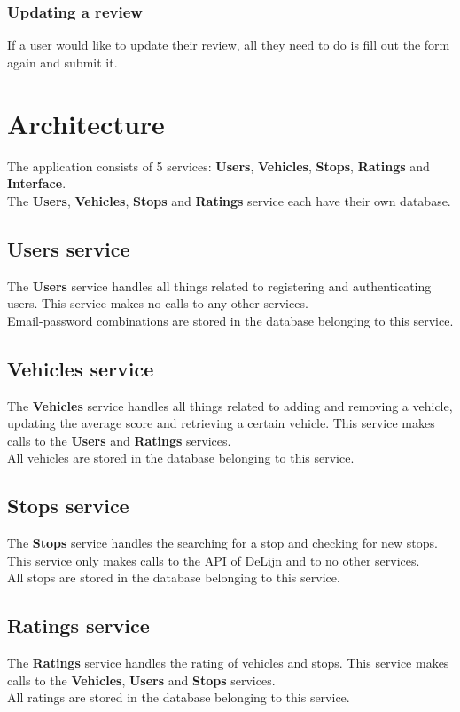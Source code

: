 \documentclass[12pt]{article}
\begin{document}
\subsubsection{Updating a review}
If a user would like to update their review, all they need to do is fill out the form again and submit it.
\newpage

\section{Architecture}
The application consists of 5 services: \textbf{Users}, \textbf{Vehicles}, \textbf{Stops}, \textbf{Ratings} and \textbf{Interface}.\\
The \textbf{Users}, \textbf{Vehicles}, \textbf{Stops} and \textbf{Ratings} service each have their own database. 

\subsection{Users service}
The \textbf{Users} service handles all things related to registering and authenticating users. This service makes no calls to any other services.\\ 
Email-password combinations are stored in the database belonging to this service.

\subsection{Vehicles service}
The \textbf{Vehicles} service handles all things related to adding and removing a vehicle, updating the average score and retrieving a certain vehicle. This service makes calls to the \textbf{Users} and \textbf{Ratings} services.\\
All vehicles are stored in the database belonging to this service.

\subsection{Stops service}
The \textbf{Stops} service handles the searching for a stop and checking for new stops. This service only makes calls to the API of DeLijn and to no other services.\\ 
All stops are stored in the database belonging to this service.

\subsection{Ratings service}
The \textbf{Ratings} service handles the rating of vehicles and stops. This service makes calls to the \textbf{Vehicles}, \textbf{Users} and \textbf{Stops} services.\\
All ratings are stored in the database belonging to this service.
\end{document}
